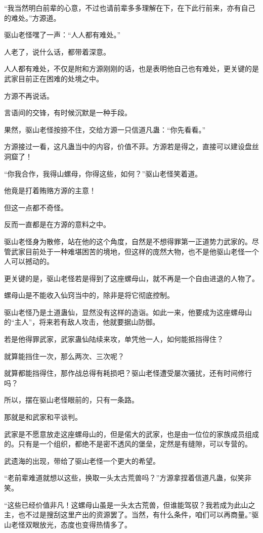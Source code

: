 \begin{this_body}
“我当然明白前辈的心意，不过也请前辈多多理解在下，在下此行前来，亦有自己的难处。”方源道。

驱山老怪嘿了一声：“人人都有难处。”

人老了，说什么话，都带着深意。

人人都有难处，不仅是附和方源刚刚的话，也是表明他自己也有难处，更关键的是武家目前正在困难的处境之中。

方源不再说话。

言语间的交锋，有时候沉默是一种手段。

果然，驱山老怪按捺不住，交给方源一只信道凡蛊：“你先看看。”

方源接过一看，这凡蛊当中的内容，价值不菲。方源若是得之，直接可以建设盘丝洞窟了！

“你我合作，我得山螺母，你得这些，如何？”驱山老怪笑着道。

他竟是打着贿赂方源的主意！

但这一点都不奇怪。

反而一直都是在方源的意料之中。

驱山老怪身为散修，站在他的这个角度，自然是不想得罪第一正道势力武家的。尽管武家目前处于一种难堪困苦的境地，但这样的庞然大物，也不是他驱山老怪一个人可以撼动的。

更关键的是，驱山老怪若是得到了这座螺母山，就不再是一个自由进退的人物了。

螺母山是不能收入仙窍当中的，除非是将它彻底控制。

驱山老怪乃是土道蛊仙，显然没有这样的造诣。如此一来，他要成为这座螺母山的“主人”，将来若有敌人攻击，他就要据山防御。

若是他得罪武家，武家蛊仙陆续来攻，单凭他一人，如何能抵挡得住？

就算能挡住一次，那么两次、三次呢？

就算都能挡得住，那作战总得有耗损吧？驱山老怪遭受屡次骚扰，还有时间修行吗？

所以，摆在驱山老怪眼前的，只有一条路。

那就是和武家和平谈判。

武家是不愿意放走这座螺母山的，但是偌大的武家，也是由一位位的家族成员组成的。只有是一个组织，都绝不是密不透风的堡垒，定然是有缝隙，可以专营的。

武遗海的出现，带给了驱山老怪一个更大的希望。

“老前辈难道就想以这些，换取一头太古荒兽吗？”方源拿捏着信道凡蛊，似笑非笑。

“这些已经价值非凡！这螺母山虽是一头太古荒兽，但谁能驾驭？我若成为此山之主，也不过是搜刮这里产出的资源罢了。当然，有什么条件，咱们可以再商量。”驱山老怪双眼放光，态度也变得热情多了。


\end{this_body}
